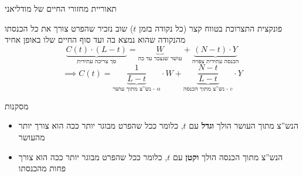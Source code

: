 \documentclass[usenames,dvipsnames]{beamer}
\begin{document}
\begin{RTL}
\begin{frame}[allowframebreaks]{תאוריית מחזורי החיים של מודליאני}
\begin{flushleft}
\end{flushleft}

\framebreak
\begin{block}{פונקצית התצרוכת בטווח קצר (כל נקודה בזמן $t$)}
    שוב נזכיר שהפרט צורך את כל הכנסתו מהנקודה שהוא נמצא בה ועד סוף החיים שלו באופן אחיד
    $$
   \underbrace{ C\left(t\right) \cdot \left(L-t\right)}_{\text{סך צריכה עתידית}} = \underbrace{W}_{\text{עושר שנצבר עד כה}} + \underbrace{ \left(N-t\right) \cdot Y}_{\text{הכנסה עתידית צפויה}}
   $$
   $$
   \implies C(t) = \underbrace{\frac{1}{L-t}}_{\text{נש''צ מתוך עושר - $\alpha$}}\cdot W +\underbrace{ \frac{N-t}{L-t}}_{\text{נש''צ מתוך הכנסה - $c$}}\cdot Y
   $$


    
\end{block}

\begin{exampleblock}{מסקנות}
    \begin{itemize}
        \item הנש''צ מתוך העושר הולך \textbf{וגדל} עם $t$, כלומר ככל שהפרט מבוגר יותר ככה הוא צורך יותר מהעושר
        \item הנש''צ מתוך הכנסה הולך \textbf{וקטן} עם $t$, כלומר ככל שהפרט מבוגר יותר ככה הוא צורך פחות מהכנסתו
    \end{itemize}
    

\end{exampleblock}
\end{frame}
\end{RTL}
\end{document}
